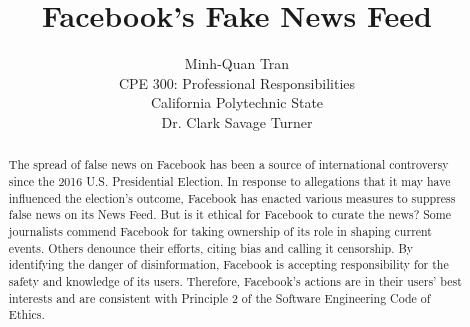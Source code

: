 

\title{\vfill Facebook's Fake News Feed\\
\vspace{8pt}
\normalsize{}
}

\author{Minh-Quan Tran\\
\normalsize{CPE 300: Professional Responsibilities}\\
\normalsize{California Polytechnic State}\\
\normalsize{Dr. Clark Savage Turner}
}

\maketitle


\vfill

\begin{abstract}
The spread of false news on Facebook has been a source of international controversy since the 2016 U.S. Presidential Election. \cite{telegraph_fn} In response to allegations that it may have influenced the election's outcome, \cite{tc_snowden,stanford_study} Facebook has enacted various measures to suppress false news on its News Feed. \cite{fb_hoaxes_2016,guardian_tips} But is it ethical for Facebook to curate the news? Some journalists commend Facebook for taking ownership of its role in shaping current events. \cite{cnn_fight} Others denounce their efforts, citing bias \cite{vox_sentences} and calling it censorship. \cite{milo_censor} By identifying the danger of disinformation, Facebook is accepting responsibility for the safety and knowledge of its users. Therefore, Facebook's actions are in their users' best interests and are consistent with Principle 2 of the Software Engineering Code of Ethics. \cite{se_code} 
\end{abstract}

\thispagestyle{empty} 
\pagebreak